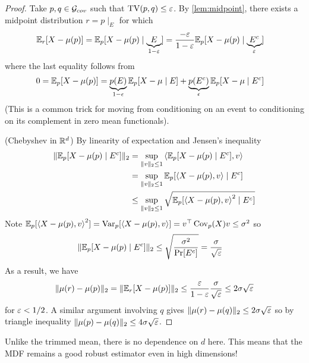 \begin{proof}
    Take $p, q \in \mathcal{G}_{cov}$ such that $\operatorname{TV}(p, q) \leq \varepsilon$.
    By \cref{lem:midpoint}, there exists a midpoint distribution
    $r = p \mid_E$ for which
    \begin{align}
        \mathbb{E}_r[X - \mu(p)]
        &= \mathbb{E}_p[X - \mu(p) \mid \underbrace{E}_{1 - \varepsilon}]
        = \frac{-\varepsilon}{1 - \varepsilon} \mathbb{E}_p[X - \mu(p) \mid \underbrace{E^c}_{\varepsilon}]
    \end{align}
    where the last equality follows from
    \begin{align}
        0
        &= \mathbb{E}_p[X - \mu(p)]
        = \underbrace{p(E)}_{1-\epsilon} \mathbb{E}_p[ X - \mu \mid E] + \underbrace{p(E^c)}_{\epsilon} \mathbb{E}_p[X - \mu \mid E^c]
    \end{align}
    (This is a common trick for moving from conditioning on an event to
    conditioning on its complement in zero mean functionals).

    (Chebyshev in $\mathbb{R}^d$) By linearity of expectation and Jensen's inequality
    \begin{align}
        \| \mathbb{E}_p[X - \mu(p) \mid E^c] \|_2
        &= \sup_{\|v \|_2 \leq 1} \braket{\mathbb{E}_p[X - \mu(p) \mid E^c], v} \\
        &= \sup_{\|v\|_2 \leq 1} \mathbb{E}_p [\braket{X - \mu(p), v} \mid E^c] \\
        &\leq \sup_{\|v \|_2 \leq 1} \sqrt{\mathbb{E}_p[\braket{X - \mu(p), v}^2 \mid E^c]}
    \end{align}
    Note $\mathbb{E}_p[\braket{X - \mu(p), v}^2]
    = \operatorname{Var}_p[\braket{X - \mu(p), v}]
    = v^\top \operatorname{Cov}_p(X) v \leq \sigma^2$ so
    \begin{align}
        \| \mathbb{E}_p[X - \mu(p) \mid E^c] \|_2
        &\leq \sqrt{\frac{\sigma^2}{\Pr[E^c]}}
        = \frac{\sigma}{\sqrt{\varepsilon}}
        \label{eq:9-3-cheb-cov-control}
    \end{align}
    As a result, we have
    \begin{align}
        \|\mu(r) - \mu(p)\|_2 = \|\mathbb{E}_r[X - \mu(p)]\|_2 \leq \frac{\varepsilon}{1 - \varepsilon} \frac{\sigma}{\sqrt{\varepsilon}} \leq 2 \sigma \sqrt{\varepsilon}
    \end{align}
    for $\varepsilon < 1/2$.
    A similar argument involving $q$ gives $\|\mu(r) - \mu(q)\|_2 \leq 2 \sigma \sqrt{\varepsilon}$
    so by triangle inequality $\|\mu(p) - \mu(q)\|_2 \leq 4 \sigma \sqrt{\varepsilon}$.
\end{proof}

\begin{remark}
    Unlike the trimmed mean, there is no dependence on $d$ here.
    This means that the MDF remains a good robust estimator even in high dimensions!
\end{remark}

